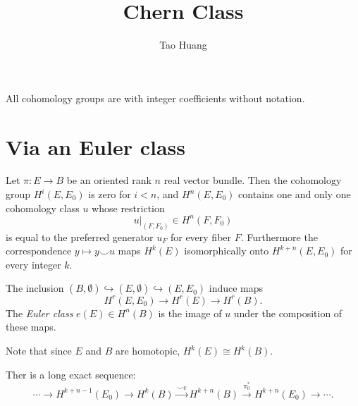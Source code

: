 \documentclass[11pt]{homework}
\title{Chern Class}
\author{Tao Huang}
\begin{document}
    
\maketitle

All cohomology groups are with integer coefficients without notation. 

\section{Via an Euler class}
\begin{theorem}
    Let $\pi:E\rightarrow B$ be an oriented rank $n$ real vector bundle. Then the cohomology group $H^{i}\left(E, E_{0}\right)$ is zero for $i<n$, and $H^{n}\left(E, E_{0}\right)$ contains one and only one cohomology class $u$ whose restriction
    \begin{equation*}
        u \vert_{\left(F, F_{0}\right)} \in H^{n}\left(F, F_{0}\right)
    \end{equation*}
    is equal to the preferred generator $u_{F}$ for every fiber $F$. Furthermore the correspondence $y \mapsto y \smile u$ maps $H^{k}(E)$ isomorphically onto $H^{k+n}\left(E, E_{0}\right)$ for every integer $k$.
\end{theorem} 
\begin{definition}
    The inclusion $(B,\emptyset )\hookrightarrow (E,\emptyset )\hookrightarrow (E, E_{0})$ induce maps
    \begin{equation*}
        H^{r}(E,E_{0})\to H^{r}(E)\to H^{r}(B).
    \end{equation*}
    The \textit{Euler class} $e(E) \in H^n(B)$ is the image of $u$ under the composition of these maps.
\end{definition}
Note that since $E$ and $B$ are homotopic, $H^{k}(E) \cong H^{k}(B)$.
\begin{proposition}
    \label{prop:gysin}
    Ther is a long exact sequence:
    \begin{equation*}
        \cdots \rightarrow H^{k+n-1}(E_0) \rightarrow H^{k}(B) \xrightarrow{\smile e} H^{k+n}(B) \xrightarrow{\pi_0^*} H^{k+n}(E_0) \rightarrow \cdots.
    \end{equation*}
\end{proposition}
\end{document}
